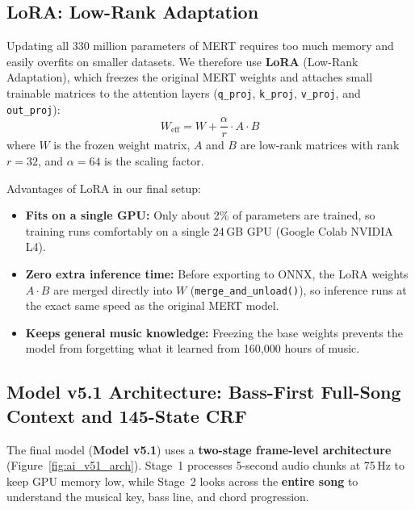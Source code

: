 \documentclass[a4paper]{article}
\begin{document}
\subsection{LoRA: Low-Rank Adaptation}

Updating all 330 million parameters of MERT requires too much memory and easily overfits on smaller datasets. We therefore use \textbf{LoRA} (Low-Rank Adaptation), which freezes the original MERT weights and attaches small trainable matrices to the attention layers (\texttt{q\_proj}, \texttt{k\_proj}, \texttt{v\_proj}, and \texttt{out\_proj}):
\[
    W_{\text{eff}} = W + \frac{\alpha}{r} \cdot A \cdot B
\]
where $W$ is the frozen weight matrix, $A$ and $B$ are low-rank matrices with rank $r=32$, and $\alpha=64$ is the scaling factor.

Advantages of LoRA in our final setup:
\begin{itemize}
    \item \textbf{Fits on a single GPU:} Only about 2\% of parameters are trained, so training runs comfortably on a single 24\,GB GPU (Google Colab NVIDIA L4).
    \item \textbf{Zero extra inference time:} Before exporting to ONNX, the LoRA weights $A \cdot B$ are merged directly into $W$ (\texttt{merge\_and\_unload()}), so inference runs at the exact same speed as the original MERT model.
    \item \textbf{Keeps general music knowledge:} Freezing the base weights prevents the model from forgetting what it learned from 160,000 hours of music.
\end{itemize}

\subsection{Model v5.1 Architecture: Bass-First Full-Song Context and 145-State CRF}

The final model (\textbf{Model v5.1}) uses a \textbf{two-stage frame-level architecture} (Figure~\ref{fig:ai_v51_arch}). Stage~1 processes 5-second audio chunks at 75\,Hz to keep GPU memory low, while Stage~2 looks across the \textbf{entire song} to understand the musical key, bass line, and chord progression.
\end{document}
